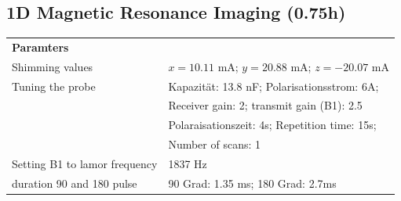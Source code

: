     
    \subsection{1D Magnetic Resonance Imaging (0.75h)}



    \begin{tabular}{ll}

        {\bf Paramters} &            \\
        
        Shimming values & $x = 10.11$ mA; $y = 20.88$ mA; $z = −20.07$ mA \\
        
        Tuning the probe & Kapazität: 13.8 nF; Polarisationsstrom: 6A;\\
        & Receiver gain: 2; transmit gain (B1): 2.5\\
        & Polaraisationszeit: 4s; Repetition time: 15s; \\
        & Number of scans: 1\\
        
        Setting B1 to lamor frequency &    1837 Hz \\
        
        duration 90 and 180 pulse & 90 Grad: 1.35 ms; 180 Grad: 2.7ms \\
        \end{tabular}  
        
        \vspace{1cm}

